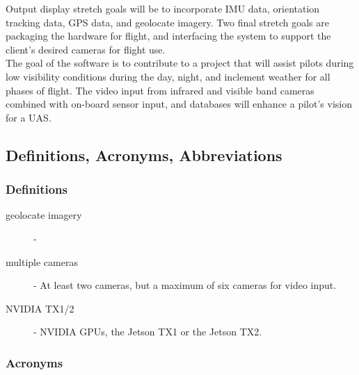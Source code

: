 \documentclass[letterpaper,10pt,serif,draftclsnofoot,onecolumn,compsoc,titlepage]{IEEEtran}
\begin{document}
Output display stretch goals will be to incorporate IMU data, orientation tracking 
data, GPS data, and geolocate imagery. Two final stretch goals are packaging the 
hardware for flight, and interfacing the system to support the client's desired 
cameras for flight use.\\

The goal of the software is to contribute to a project that will assist pilots during 
low visibility conditions during the day, night, and inclement weather for all phases 
of flight. The video input from infrared and visible band cameras combined with 
on-board sensor input, and databases will enhance a pilot's vision for a UAS.\\

\subsection{Definitions, Acronyms, Abbreviations}

\subsubsection{Definitions}

\begin{description}
	\item[geolocate imagery] - 
	\item[multiple cameras] - At least two cameras, but a maximum of six cameras for 
	video input.
	\item[NVIDIA TX1/2] - NVIDIA GPUs, the Jetson TX1 or the Jetson TX2.  
\end{description}

\subsubsection{Acronyms}
\end{document}
